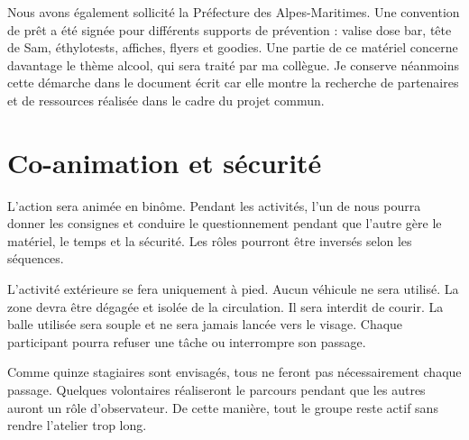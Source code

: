 Nous avons également sollicité la Préfecture des Alpes-Maritimes. Une convention de prêt a été signée pour différents supports de prévention : valise dose bar, tête de Sam, éthylotests, affiches, flyers et goodies. Une partie de ce matériel concerne davantage le thème alcool, qui sera traité par ma collègue. Je conserve néanmoins cette démarche dans le document écrit car elle montre la recherche de partenaires et de ressources réalisée dans le cadre du projet commun.

\section{Co-animation et sécurité}

L’action sera animée en binôme. Pendant les activités, l’un de nous pourra donner les consignes et conduire le questionnement pendant que l’autre gère le matériel, le temps et la sécurité. Les rôles pourront être inversés selon les séquences.

L’activité extérieure se fera uniquement à pied. Aucun véhicule ne sera utilisé. La zone devra être dégagée et isolée de la circulation. Il sera interdit de courir. La balle utilisée sera souple et ne sera jamais lancée vers le visage. Chaque participant pourra refuser une tâche ou interrompre son passage.

Comme quinze stagiaires sont envisagés, tous ne feront pas nécessairement chaque passage. Quelques volontaires réaliseront le parcours pendant que les autres auront un rôle d’observateur. De cette manière, tout le groupe reste actif sans rendre l’atelier trop long.

